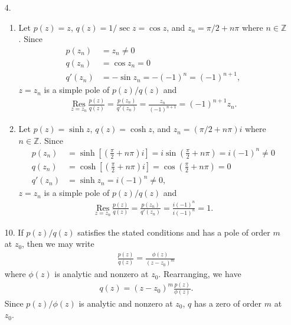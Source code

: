 \documentclass[a4paper,12pt]{article}
\begin{document}
\begin{enumerate}
    \item[4.]
        \begin{enumerate}
            \item
                Let $p(z) = z$, $q(z) = 1 / \sec z = \cos z$, and $z_n = \pi/2 + n\pi$ where $n \in \mathbb{Z}$. Since
                \begin{align*}
                    p(z_n) &= z_n \neq 0 \\
                    q(z_n) &= \cos z_n = 0 \\
                    q'(z_n) &= -\sin z_n = -(-1)^n = (-1)^{n + 1},
                \end{align*}
                $z = z_n$ is a simple pole of $p(z) / q(z)$ and
                \begin{align*}
                    \underset{z = z_n}{\text{\ Res\ }} \frac{p(z)}{q(z)} = \frac{p(z_n)}{q'(z_n)} = \frac{z_n}{(-1)^{n + 1}} = (-1)^{n + 1} z_n.
                \end{align*}

            \item
                Let $p(z) = \sinh z$, $q(z) = \cosh z$, and $z_n = (\pi/2 + n\pi)i$ where $n \in \mathbb{Z}$. Since
                \begin{align*}
                    p(z_n) &= \sinh \left[ \left( \frac{\pi}{2} + n\pi \right) i \right] = i \sin \left( \frac{\pi}{2} + n\pi \right) = i(-1)^n \neq 0 \\
                    q(z_n) &= \cosh \left[ \left( \frac{\pi}{2} + n\pi \right) i \right] = \cos \left( \frac{\pi}{2} + n\pi \right) = 0 \\
                    q'(z_n) &= \sinh z_n = i(-1)^n \neq 0,
                \end{align*}
                $z = z_n$ is a simple pole of $p(z) / q(z)$ and
                \begin{align*}
                    \underset{z = z_n}{\text{\ Res\ }} \frac{p(z)}{q(z)} = \frac{p(z_n)}{q'(z_n)} = \frac{i(-1)^n}{i(-1)^n} = 1.
                \end{align*}
        \end{enumerate}

    \item[10.]
        If $p(z)/q(z)$ satisfies the stated conditions and has a pole of order $m$ at $z_0$, then we may write
        \begin{align*}
            \frac{p(z)}{q(z)} = \frac{\phi(z)}{(z - z_0)^m}
        \end{align*}
        where $\phi(z)$ is analytic and nonzero at $z_0$. Rearranging, we have
        \begin{align*}
            q(z) = (z - z_0)^m \frac{p(z)}{\phi(z)}.
        \end{align*}
        Since $p(z)/\phi(z)$ is analytic and nonzero at $z_0$, $q$ has a zero of order $m$ at $z_0$.


\end{enumerate}
\end{document}
